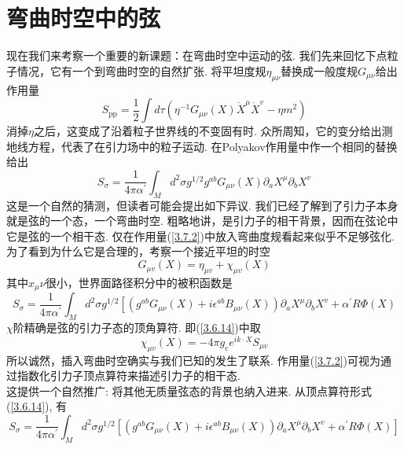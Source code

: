 \section{弯曲时空中的弦}%
现在我们来考察一个重要的新课题：在弯曲时空中运动的弦. 我们先来回忆下点粒子情况，它有一个到弯曲时空的自然扩张. 将平坦度规$\eta_{\mu\nu}$替换成一般度规$G_{\mu\nu}$给出作用量
\begin{equation}
S_{\mathrm{pp}}=\frac{1}{2} \int d \tau\left(\eta^{-1} G_{\mu \nu}(X) \dot{X}^{\mu} \dot{X}^{v}-\eta m^{2}\right)
\end{equation}
消掉$\eta$之后，这变成了沿着粒子世界线的不变固有时. 众所周知，它的变分给出测地线方程，代表了在引力场中的粒子运动. 在Polyakov作用量中作一个相同的替换给出
\begin{equation}\label{3.7.2}
S_{\sigma}=\frac{1}{4 \pi \alpha^{\prime}} \int_{M} d^{2} \sigma g^{1 / 2} g^{a b} G_{\mu \nu}(X) \partial_{a} X^{\mu} \partial_{b} X^{v}
\end{equation}
这是一个自然的猜测，但读者可能会提出如下异议. 我们已经了解到了引力子本身就是弦的一个态，一个弯曲时空. 粗略地讲，是引力子的相干背景，因而在弦论中它是弦的一个相干态. 仅在作用量(\ref{3.7.2})中放入弯曲度规看起来似乎不足够弦化. 为了看到为什么它是合理的，考察一个接近平坦的时空
\begin{equation}
G_{\mu v}(X)=\eta_{\mu v}+\chi_{\mu v}(X)
\end{equation}
其中$x_\mu\nu$很小，世界面路径积分中的被积函数是                                        \begin{equation}
S_{\sigma}=\frac{1}{4 \pi \alpha^{\prime}} \int_{M} d^{2} \sigma g^{1 / 2}\left[\left(g^{a b} G_{\mu \nu}(X)+i \epsilon^{a b} B_{\mu \nu}(X)\right) \partial_{a} X^{\mu} \partial_{b} X^{v}+\alpha^{\prime} R \Phi(X)\right.
\end{equation}
$\chi$阶精确是弦的引力子态的顶角算符. 即(\ref{3.6.14})中取
\begin{equation}
\chi_{\mu v}(X)=-4 \pi g_{\mathrm{c}} e^{i k \cdot X} S_{\mu v}
\end{equation}
所以诚然，插入弯曲时空确实与我们已知的发生了联系. 作用量(\ref{3.7.2})可视为通过指数化引力子顶点算符来描述引力子的相干态.\\
这提供一个自然推广: 将其他无质量弦态的背景也纳入进来. 从顶点算符形式(\ref{3.6.14}), 有
\begin{equation}\label{3.7.6}
S_{\sigma}=\frac{1}{4 \pi \alpha^{\prime}} \int_{M} d^{2} \sigma g^{1 / 2}\left[\left(g^{a b} G_{\mu \nu}(X)+i \epsilon^{a b} B_{\mu \nu}(X)\right) \partial_{a} X^{\mu} \partial_{b} X^{v}+\alpha^{\prime} R \Phi(X)\right]
\end{equation}
